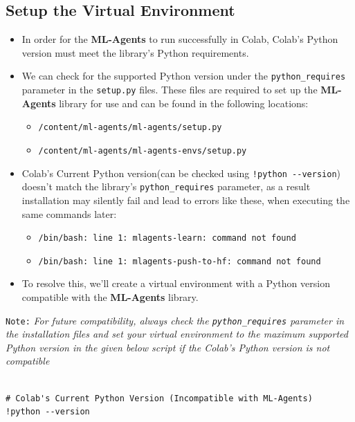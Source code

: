 \documentclass[11pt,a4paper]{article}
\begin{document}
\subsection{Setup the Virtual Environment}\label{setup-the-virtual-environment}

\begin{itemize}
\item
  In order for the \textbf{ML-Agents} to run successfully in Colab, Colab's Python version must meet the library's Python requirements.
\item
  We can check for the supported Python version under the \texttt{python\_requires} parameter in the \texttt{setup.py} files. These files are required to set up the \textbf{ML-Agents} library for use and can be found in the following locations:

  \begin{itemize}
  \tightlist
  \item
    \texttt{/content/ml-agents/ml-agents/setup.py}
  \item
    \texttt{/content/ml-agents/ml-agents-envs/setup.py}
  \end{itemize}
\item
  Colab's Current Python version(can be checked using \texttt{!python\ -\/-version}) doesn't match the library's \texttt{python\_requires} parameter, as a result installation may silently fail and lead to errors like these, when executing the same commands later:

  \begin{itemize}
  \tightlist
  \item
    \texttt{/bin/bash:\ line\ 1:\ mlagents-learn:\ command\ not\ found}
  \item
    \texttt{/bin/bash:\ line\ 1:\ mlagents-push-to-hf:\ command\ not\ found}
  \end{itemize}
\item
  To resolve this, we'll create a virtual environment with a Python version compatible with the \textbf{ML-Agents} library.
\end{itemize}

\texttt{Note:} \emph{For future compatibility, always check the \texttt{python\_requires} parameter in the installation files and set your virtual environment to the maximum supported Python version in the given below script if the Colab's Python version is not compatible}

\begin{lstlisting}

# Colab's Current Python Version (Incompatible with ML-Agents)
!python --version
\end{lstlisting}
\end{document}
